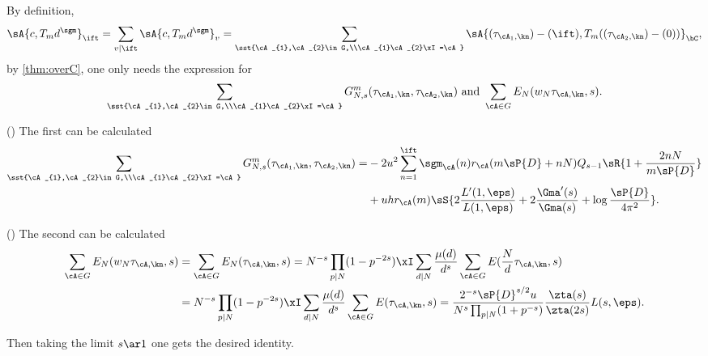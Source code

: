 \documentclass[article, a4paper, twoside]{universal}
\begin{document}
\begin{prf}
	By definition,
	\[
	  \sA{c,T_{m}d^{\sgm}}_{\ift}=\sum_{v\mid\ift}\sA{c,T_{m}d^{\sgm}}_{v}=\sum_{\sst{\cA_{1},\cA_{2}\in G,\\\cA_{1}\cA_{2}\xI=\cA}}\sA{(\tau_{\cA_{1},\kn})-(\ift),T_{m}((\tau_{\cA_{2},\kn})-(0))}_{\bC},
	\]
	by \cref{thm:overC}, one only needs the expression for
	\begin{align*}
	  \sum_{\sst{\cA_{1},\cA_{2}\in G,\\\cA_{1}\cA_{2}\xI=\cA}}G_{N,s}^{m}(\tau_{\cA_{1},\kn},\tau_{\cA_{2},\kn}) \text{ and } \sum_{\cA\in G}E_{N}(w_{N}\tau_{\cA,\kn},s).
	\end{align*}

	(\cite[II.5.8]{GZ1986}) The first can be calculated
	\begin{align*}
	  \sum_{\sst{\cA_{1},\cA_{2}\in G,\\\cA_{1}\cA_{2}\xI=\cA}}G_{N,s}^{m}(\tau_{\cA_{1},\kn},\tau_{\cA_{2},\kn})=&-2u^{2}\sum_{n=1}^{\ift}\sgm_{\cA}(n)r_{\cA}(m\sP{D}+nN)Q_{s-1}\sR{1+\frac{2nN}{m\sP{D}}}\\
	  &+uhr_{\cA}(m)\sS{2\frac{L'(1,\eps)}{L(1,\eps)}+2\frac{\Gma'(s)}{\Gma(s)}+\log{\frac{\sP{D}}{4\pi^{2}}}}.
	\end{align*}

	(\cite[II.4.1]{GZ1986}) The second can be calculated
	\begin{align*}
	  \sum_{\cA\in G}E_{N}(w_{N}\tau_{\cA,\kn},s)&=\sum_{\cA\in G}E_{N}(\tau_{\cA,\kn},s)=N^{-s}\prod_{p\mid N}(1-p^{-2s})\xI\sum_{d\mid N}\frac{\mu(d)}{d^{s}}\sum_{\cA\in G}E(\frac{N}{d}\tau_{\cA,\kn},s) \\
										 &=N^{-s}\prod_{p\mid N}(1-p^{-2s})\xI\sum_{d\mid N}\frac{\mu(d)}{d^{s}}\sum_{\cA\in G}E(\tau_{\cA,\kn},s)=\frac{2^{-s}\sP{D}^{s/2}u}{N^{s}\prod_{p\mid N}(1+p^{-s})}\frac{\zta(s)}{\zta(2s)}L(s,\eps).
	\end{align*}

	Then taking the limit $s\ar1$ one gets the desired identity.


\end{prf}
\end{document}
